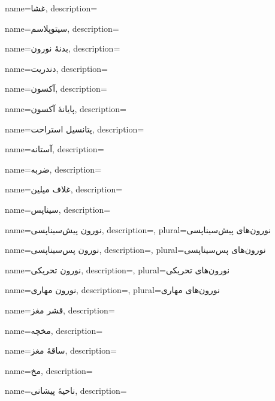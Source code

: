 {
	name={غشا},
	description=\hfill{}
}

{
	name={سیتوپلاسم},
	description=\hfill{}
}

{
	name={بدنهٔ نورون},
	description=\hfill{}
}

{
	name={دندریت},
	description=\hfill{}
}

{
	name={آکسون},
	description=\hfill{}
}

{
	name={پایانهٔ آکسون},
	description=\hfill{}
}

{
	name={پتانسیل استراحت},
	description=\hfill{}
}

{
	name={آستانه},
	description=\hfill{}
}

{
	name={ضربه},
	description=\hfill{}
}

{
	name={غلاف میلین},
	description=\hfill{}
}

{
	name={سیناپس},
	description=\hfill{}
}

{
	name={نورون پیش‌سیناپسی},
	description=\hfill{},
    plural={نورون‌های پیش‌سیناپسی}
}

{
	name={نورون پس‌سیناپسی},
	description=\hfill{},
    plural={نورون‌های پس‌سیناپسی}
}

{
	name={نورون تحریکی},
	description=\hfill{},
    plural={نورون‌های تحریکی}
}

{
	name={نورون مهاری},
	description=\hfill{},
    plural={نورون‌های مهاری}
}

{
	name={قشر مغز},
	description=\hfill{}
}

{
	name={مخچه},
	description=\hfill{}
}

{
	name={ساقهٔ مغز},
	description=\hfill{}
}

{
	name={مخ},
	description=\hfill{}
}

{
	name={ناحیهٔ پیشانی},
	description=\hfill{}
}

